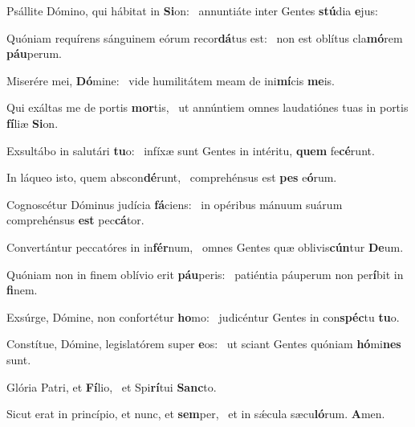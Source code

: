 \item Psállite Dómino, qui hábitat in \textbf{Si}on:~\psstar{} annuntiáte inter Gentes \textbf{stú}dia \textbf{e}jus:
\item Quóniam requírens sánguinem eórum recor\textbf{dá}tus est:~\psstar{} non est oblítus cla\textbf{mó}rem \textbf{páu}perum.
\item Miserére mei, \textbf{Dó}mine:~\psstar{} vide humilitátem meam de ini\textbf{mí}cis \textbf{me}is.
\item Qui exáltas me de portis \textbf{mor}tis,~\psstar{} ut annúntiem omnes laudatiónes tuas in portis \textbf{fí}liæ \textbf{Si}on.
\item Exsultábo in salutári \textbf{tu}o:~\psstar{} infíxæ sunt Gentes in intéritu, \textbf{quem} fe\textbf{cé}runt.
\item In láqueo isto, quem abscon\textbf{dé}runt,~\psstar{} comprehénsus est \textbf{pes} e\textbf{ó}rum.
\item Cognoscétur Dóminus judícia \textbf{fá}ciens:~\psstar{} in opéribus mánuum suárum comprehénsus \textbf{est} pec\textbf{cá}tor.
\item Convertántur peccatóres in in\textbf{fér}num,~\psstar{} omnes Gentes quæ oblivis\textbf{cún}tur \textbf{De}um.
\item Quóniam non in finem oblívio erit \textbf{páu}peris:~\psstar{} patiéntia páuperum non per\textbf{í}bit in \textbf{fi}nem.
\item Exsúrge, Dómine, non confortétur \textbf{ho}mo:~\psstar{} judicéntur Gentes in con\textbf{spéc}tu \textbf{tu}o.
\item Constítue, Dómine, legislatórem super \textbf{e}os:~\psstar{} ut sciant Gentes quóniam \textbf{hó}mi\textbf{nes} sunt.
\item Glória Patri, et \textbf{Fí}lio,~\psstar{} et Spi\textbf{rí}tui \textbf{Sanc}to.
\item Sicut erat in princípio, et nunc, et \textbf{sem}per,~\psstar{} et in sǽcula sæcu\textbf{ló}rum. \textbf{A}men.
